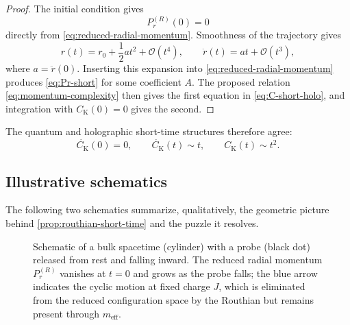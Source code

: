 \documentclass[11pt,a4paper]{article}
\theoremstyle{plain}
\theoremstyle{definition}
\theoremstyle{remark}
\newcommand{\PrR}{P_r^{(R)}}
\newcommand{\Ck}{C_{\mathrm K}}
\newcommand{\meff}{m_{\mathrm{eff}}}
\begin{document}
\begin{proof}
The initial condition gives
\begin{equation*}
\PrR(0)=0
\end{equation*}
directly from \eqref{eq:reduced-radial-momentum}. Smoothness of the trajectory gives
\begin{equation*}
r(t)=r_0+\frac12a t^2+\mathcal O(t^4),
\qquad
\dot r(t)=at+\mathcal O(t^3),
\end{equation*}
where $a=\ddot r(0)$. Inserting this expansion into \eqref{eq:reduced-radial-momentum} produces \eqref{eq:Pr-short} for some coefficient $A$. The proposed relation \eqref{eq:momentum-complexity} then gives the first equation in \eqref{eq:C-short-holo}, and integration with $\Ck(0)=0$ gives the second.
\end{proof}

The quantum and holographic short-time structures therefore agree:
\begin{equation*}
\boxed{
\dot{\Ck}(0)=0,
\qquad
\dot{\Ck}(t)\sim t,
\qquad
\Ck(t)\sim t^2.
}
\end{equation*}

\subsection{Illustrative schematics}

The following two schematics summarize, qualitatively, the geometric picture behind \cref{prop:routhian-short-time} and the puzzle it resolves.

\begin{figure}[ht]
\centering
{}
\caption{Schematic of a bulk spacetime (cylinder) with a probe (black dot) released from rest and falling inward. The reduced radial momentum $\PrR$ vanishes at $t=0$ and grows as the probe falls; the blue arrow indicates the cyclic motion at fixed charge $J$, which is eliminated from the reduced configuration space by the Routhian but remains present through $\meff$.}
\label{fig:ads-cylinder}
\end{figure}
\end{document}
